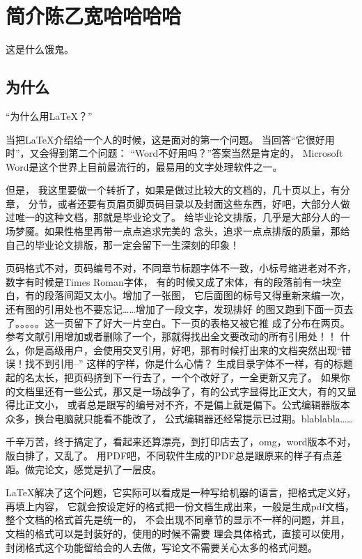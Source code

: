 \chapter{简介陈乙宽哈哈哈哈}

这是什么饿鬼。

\section{为什么}

“为什么用\LaTeX{}{}？”

当把\LaTeX{}{}介绍给一个人的时候，这是面对的第一个问题。
当回答“它很好用时”，又会得到第二个问题：
“Word不好用吗？”答案当然是肯定的，
Microsoft Word是这个世界上目前最流行的，最易用的文字处理软件之一。

但是，
我这里要做一个转折了，如果是做过比较大的文档的，几十页以上，有分章，
分节，或者还要有页眉页脚页码目录以及封面这些东西，好吧，大部分人做过唯一的这种文档，那就是毕业论文了。
给毕业论文排版，几乎是大部分人的一场梦魇。如果性格里再带一点点追求完美的
念头，追求一点点排版的质量，那给自己的毕业论文排版，那一定会留下一生深刻的印象！

页码格式不对，页码编号不对，不同章节标题字体不一致，小标号缩进老对不齐，
数字有时候是Times Roman字体，
有的时候又成了宋体，有的段落前有一块空白，有的段落间距又太小。增加了一张图，
它后面图的标号又得重新来编一次，还有图的引用处也不要忘记……增加了一段文字，发现排好
的图又跑到下面一页去了。。。。。这一页留下了好大一片空白。下一页的表格又被它推
成了分布在两页。参考文献引用增加或者删除了一个，那就得找出全文要改动的所有引用处！！
什么，你是高级用户，会使用交叉引用，好吧，那有时候打出来的文档突然出现“错误！找不到引用--”
这样的字样，你是什么心情？
生成目录字体不一样，有的标题起的名太长，把页码挤到下一行去了，一个个改好了，一全更新又完了。
如果你的文档里还有一些公式，那又是一场战争了，有的公式字显得比正文大，有的又显得比正文小，
或者总是跟写的编号对不齐，不是偏上就是偏下。公式编辑器版本众多，换台电脑就只能看不能改了，
公式编辑器还经常提示已过期。blablabla……

千辛万苦，终于搞定了，看起来还算漂亮，到打印店去了，omg，word版本不对，版白排了，又乱了。
用PDF吧，不同软件生成的PDF总是跟原来的样子有点差距。做完论文，感觉是扒了一层皮。

\LaTeX{}解决了这个问题，它实际可以看成是一种写给机器的语言，把格式定义好，再填上内容，
它就会按设定好的格式把一份文档生成出来，一般是生成pdf文档，整个文档的格式首先是统一的，
不会出现不同章节的显示不一样的问题，并且，文档的格式可以是封装好的，使用的时候不需要
理会具体格式，直接可以使用，封闭格式这个功能留给会的人去做，写论文不需要关心太多的格式问题。

